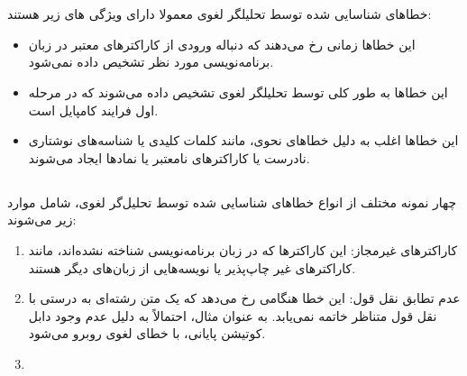 \documentclass{article}
\begin{document}


\newpage


\section{}%
\subsection{}
خطاهای شناسایی شده توسط تحلیلگر لغوی معمولا دارای ویژگی های زیر هستند:
\begin{itemize}
\item این خطاها زمانی رخ می‌دهند که دنباله ورودی از کاراکترهای معتبر در زبان برنامه‌نویسی مورد نظر تشخیص داده نمی‌شود.
\item این خطاها به طور کلی توسط تحلیلگر لغوی تشخیص داده می‌شوند که در مرحله اول فرایند کامپایل است.
\item این خطاها اغلب به دلیل خطاهای نحوی، مانند کلمات کلیدی یا شناسه‌های نوشتاری نادرست یا کاراکترهای نامعتبر یا نمادها ایجاد می‌شوند.
\end{itemize}

\subsection{}
چهار نمونه مختلف از انواع خطاهای شناسایی شده توسط تحلیل‌گر لغوی، شامل موارد زیر می‌شوند:

\begin{enumerate}
\item کاراکترهای غیرمجاز: این کاراکترها که در زبان برنامه‌نویسی شناخته نشده‌اند، مانند کاراکترهای غیر چاپ‌پذیر یا نویسه‌هایی از زبان‌های دیگر هستند.
\item عدم تطابق نقل قول: این خطا هنگامی رخ می‌دهد که یک متن رشته‌ای به درستی با نقل قول متناظر خاتمه نمی‌یابد. به عنوان مثال،  احتمالاً به دلیل عدم وجود دابل کوتیشن پایانی، با خطای لغوی روبرو می‌شود.
\item
\end{enumerate}
\end{document}

